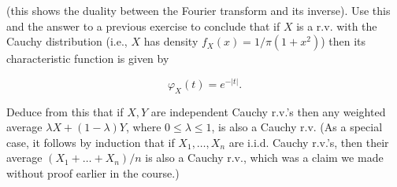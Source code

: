 \begin{enumerate}[label=\arabic*.]
\noindent (this shows the duality between the Fourier transform
and its inverse). Use this and the answer to a
previous exercise to conclude that if $X$ is a r.v.
with the Cauchy distribution (i.e., $X$ has density
$f_X(x)=1/\pi(1+x^2)$) then its characteristic
function is given by

\[
\varphi_X(t) = e^{-|t|}.
\]

\noindent Deduce from this that if $X,Y$ are independent Cauchy
r.v.'s then any weighted average
$\lambda X+(1-\lambda)Y$, where $0\le \lambda\le 1$,
is also a Cauchy r.v. (As a special case, it follows
by induction that if $X_1,\ldots,X_n$ are i.i.d.
Cauchy r.v.'s, then their average $(X_1+\ldots+X_n)/n$
is also a Cauchy r.v., which was a claim we made
without proof earlier in the course.)
\end{enumerate}

